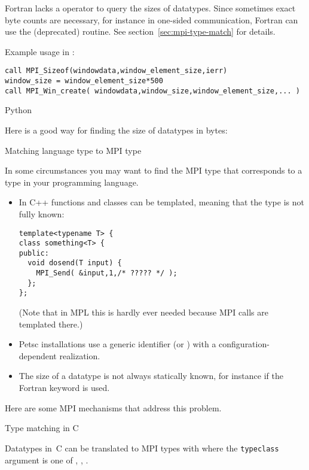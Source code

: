Fortran lacks a  operator to query the sizes of datatypes.
Since sometimes exact byte counts are necessary,
for instance in one-sided communication,
Fortran can use the (deprecated)  routine.
See section~\ref{sec:mpi-type-match} for details.

Example usage in :
\lstset{language=Fortran} %
\begin{lstlisting}
call MPI_Sizeof(windowdata,window_element_size,ierr)
window_size = window_element_size*500
call MPI_Win_create( windowdata,window_size,window_element_size,... )
\end{lstlisting}
\lstset{language=C} %

 {Python}

Here is a good way for finding the size of  datatypes
in bytes:

 {Matching language type to MPI type}
\label{sec:mpi-type-match}

In some circumstances you may want to find the MPI type
that corresponds to a type in your programming language.
\begin{itemize}
\item In C++ functions and classes can be templated,
  meaning that the type is not fully known:
\begin{lstlisting}
template<typename T> {
class something<T> {
public:
  void dosend(T input) {
    MPI_Send( &input,1,/* ????? */ );
  };
};
\end{lstlisting}
(Note that in \ac{MPL} this is hardly ever needed
because MPI calls are templated there.)
\item Petsc installations use a generic identifier 
  (or )
  with a configuration-dependent realization.
\item The size of a datatype is not always statically known, for instance if
the Fortran  keyword is used.
\end{itemize}

Here are some MPI mechanisms that address this problem.

 {Type matching in C}
\label{sec:mpi-type-match-c}

Datatypes in~C can be translated to MPI types with
%
%
where the \lstinline{typeclass} argument is one of
,
,
.

